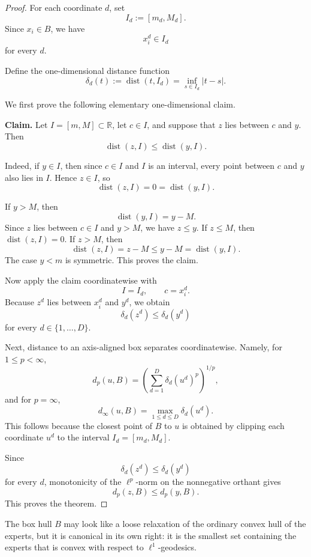 \documentclass{article} %
\begin{document}
\begin{proof}
For each coordinate \(d\), set
\[
I_d:=[m_d,M_d].
\]
Since \(x_i\in B\), we have
\[
x_i^d\in I_d
\]
for every \(d\).

Define the one-dimensional distance function
\[
\delta_d(t):=\operatorname{dist}(t,I_d)
=
\inf_{s\in I_d}|t-s|.
\]

We first prove the following elementary one-dimensional claim.

\medskip

\noindent
\textbf{Claim.}
Let \(I=[m,M]\subset \mathbb{R}\), let \(c\in I\), and suppose that
\(z\) lies between \(c\) and \(y\). Then
\[
\operatorname{dist}(z,I)\le \operatorname{dist}(y,I).
\]

\medskip

\noindent
Indeed, if \(y\in I\), then since \(c\in I\) and \(I\) is an interval,
every point between \(c\) and \(y\) also lies in \(I\). Hence \(z\in I\), so
\[
\operatorname{dist}(z,I)=0=\operatorname{dist}(y,I).
\]

If \(y>M\), then
\[
\operatorname{dist}(y,I)=y-M.
\]
Since \(z\) lies between \(c\in I\) and \(y>M\), we have \(z\le y\). If
\(z\le M\), then \(\operatorname{dist}(z,I)=0\). If \(z>M\), then
\[
\operatorname{dist}(z,I)=z-M\le y-M=\operatorname{dist}(y,I).
\]
The case \(y<m\) is symmetric. This proves the claim.

\medskip

Now apply the claim coordinatewise with
\[
I=I_d,
\qquad
c=x_i^d.
\]
Because \(z^d\) lies between \(x_i^d\) and \(y^d\), we obtain
\[
\delta_d(z^d)\le \delta_d(y^d)
\]
for every \(d\in\{1,\dots,D\}\).

Next, distance to an axis-aligned box separates coordinatewise. Namely, for
\(1\le p<\infty\),
\[
d_p(u,B)
=
\left(
\sum_{d=1}^D \delta_d(u^d)^p
\right)^{1/p},
\]
and for \(p=\infty\),
\[
d_\infty(u,B)
=
\max_{1\le d\le D}\delta_d(u^d).
\]
This follows because the closest point of \(B\) to \(u\) is obtained by
clipping each coordinate \(u^d\) to the interval \(I_d=[m_d,M_d]\).

Since
\[
\delta_d(z^d)\le \delta_d(y^d)
\]
for every \(d\), monotonicity of the \(\ell^p\)-norm on the nonnegative
orthant gives
\[
d_p(z,B)\le d_p(y,B).
\]
This proves the theorem.
\end{proof}

The box hull \(B\) may look like a loose relaxation of the ordinary convex
hull of the experts, but it is canonical in its own right: it is the
smallest set containing the experts that is convex with respect to
\(\ell^1\)-geodesics.
\end{document}
